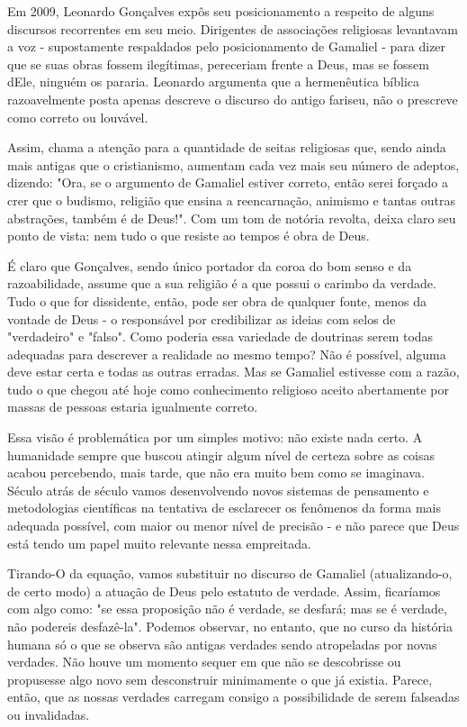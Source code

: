\documentclass[12pt, oneside,twocolumns, a4paper, brazil]{abntex2}
\begin{document}
Em 2009, Leonardo Gonçalves expôs seu posicionamento a respeito de alguns discursos recorrentes em seu meio. Dirigentes de associações religiosas levantavam a voz - supostamente respaldados pelo posicionamento de Gamaliel - para dizer que se suas obras fossem ilegítimas, pereceriam frente a Deus, mas se fossem dEle, ninguém os pararia. Leonardo argumenta que a hermenêutica bíblica razoavelmente posta apenas descreve o discurso do antigo fariseu, não o prescreve como correto ou louvável. \par
Assim, chama a atenção para a quantidade de seitas religiosas que, sendo ainda mais antigas que o cristianismo, aumentam cada vez mais seu número de adeptos, dizendo: "Ora, se o argumento de Gamaliel estiver correto, então serei forçado a crer que o budismo, religião que ensina a reencarnação, animismo e tantas outras abstrações, também é de Deus!"\cite{art1}. Com um tom de notória revolta, deixa claro seu ponto de vista: nem tudo o que resiste ao tempos é obra de Deus. \par
É claro que Gonçalves, sendo único portador da coroa do bom senso e da razoabilidade, assume que a sua religião é a que possui o carimbo da verdade. Tudo o que for dissidente, então, pode ser obra de qualquer fonte, menos da vontade de Deus - o responsável por credibilizar as ideias com selos de "verdadeiro" e "falso". Como poderia essa variedade de doutrinas serem todas adequadas para descrever a realidade ao mesmo tempo? Não é possível, alguma deve estar certa e todas as outras erradas. Mas se Gamaliel estivesse com a razão, tudo o que chegou até hoje como conhecimento religioso aceito abertamente por massas de pessoas estaria igualmente correto. \par
Essa visão é problemática por um simples motivo: não existe nada certo. A humanidade sempre que buscou atingir algum nível de certeza sobre as coisas acabou percebendo, mais tarde, que não era muito bem como se imaginava. Século atrás de século vamos desenvolvendo novos sistemas de pensamento e metodologias científicas na tentativa de esclarecer os fenômenos da forma mais adequada possível, com maior ou menor nível de precisão - e não parece que Deus está tendo um papel muito relevante nessa empreitada. \par
Tirando-O da equação, vamos substituir no discurso de Gamaliel (atualizando-o, de certo modo) a atuação de Deus pelo estatuto de verdade. Assim, ficaríamos com algo como: "se essa proposição não é verdade, se desfará; mas se é verdade, não podereis desfazê-la". Podemos observar, no entanto, que no curso da história humana só o que se observa são antigas verdades sendo atropeladas por novas verdades. Não houve um momento sequer em que não se descobrisse ou propusesse algo novo sem desconstruir minimamente o que já existia. Parece, então, que as nossas verdades carregam consigo a possibilidade de serem falseadas ou invalidadas. \par
\end{document}
